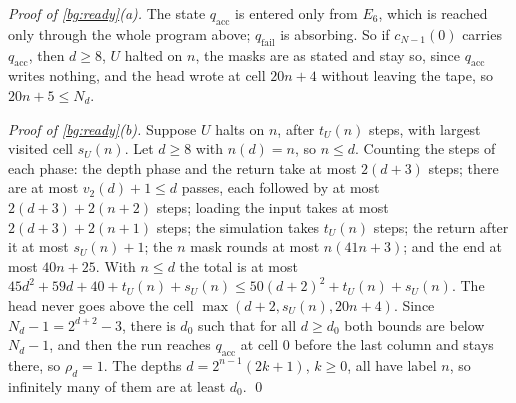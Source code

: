 \emph{Proof of \cref{bg:ready}(a).} The state $q_{\mathrm{acc}}$ is entered only from $E_6$, which is reached only through the whole program above; $q_{\mathrm{fail}}$ is absorbing. So if $c_{N-1}(0)$ carries $q_{\mathrm{acc}}$, then $d\ge8$, $U$ halted on $n$, the masks are as stated and stay so, since $q_{\mathrm{acc}}$ writes nothing, and the head wrote at cell $20n+4$ without leaving the tape, so $20n+5\le N_d$.

\emph{Proof of \cref{bg:ready}(b).} Suppose $U$ halts on $n$, after $t_U(n)$ steps, with largest visited cell $s_U(n)$. Let $d\ge8$ with $n(d)=n$, so $n\le d$. Counting the steps of each phase: the depth phase and the return take at most $2(d+3)$ steps; there are at most $v_2(d)+1\le d$ passes, each followed by at most $2(d+3)+2(n+2)$ steps; loading the input takes at most $2(d+3)+2(n+1)$ steps; the simulation takes $t_U(n)$ steps; the return after it at most $s_U(n)+1$; the $n$ mask rounds at most $n(41n+3)$; and the end at most $40n+25$. With $n\le d$ the total is at most $45d^2+59d+40+t_U(n)+s_U(n)\le50(d+2)^2+t_U(n)+s_U(n)$. The head never goes above the cell $\max(d+2,s_U(n),20n+4)$. Since $N_d-1=2^{d+2}-3$, there is $d_0$ such that for all $d\ge d_0$ both bounds are below $N_d-1$, and then the run reaches $q_{\mathrm{acc}}$ at cell $0$ before the last column and stays there, so $\rho_d=1$. The depths $d=2^{n-1}(2k+1)$, $k\ge0$, all have label $n$, so infinitely many of them are at least $d_0$. \qed
